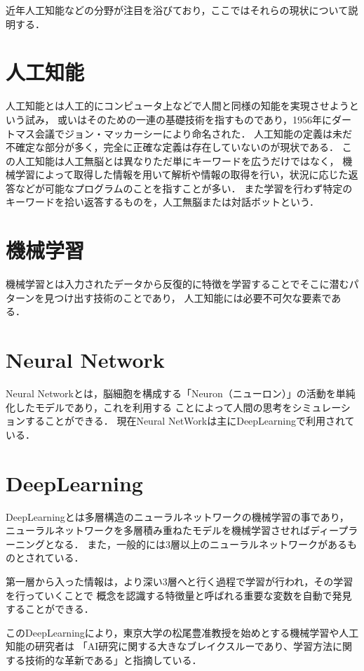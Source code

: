 近年人工知能などの分野が注目を浴びており，ここではそれらの現状について説明する．

\section{人工知能}
人工知能とは人工的にコンピュータ上などで人間と同様の知能を実現させようという試み，
或いはそのための一連の基礎技術を指すものであり，1956年にダートマス会議でジョン・マッカーシーにより命名された．
人工知能の定義は未だ不確定な部分が多く，完全に正確な定義は存在していないのが現状である．
この人工知能は人工無脳とは異なりただ単にキーワードを広うだけではなく，
機械学習によって取得した情報を用いて解析や情報の取得を行い，状況に応じた返答などが可能なプログラムのことを指すことが多い．
また学習を行わず特定のキーワードを拾い返答するものを，人工無脳または対話ボットという．

\section{機械学習}
機械学習とは入力されたデータから反復的に特徴を学習することでそこに潜むパターンを見つけ出す技術のことであり，
人工知能には必要不可欠な要素である．

\section{Neural Network}
Neural Networkとは，脳細胞を構成する「Neuron（ニューロン）」の活動を単純化したモデルであり，これを利用する
ことによって人間の思考をシミュレーションすることができる．
現在Neural NetWorkは主にDeepLearningで利用されている．

\section{DeepLearning}
DeepLearning\cite{deep}とは多層構造のニューラルネットワークの機械学習の事であり，
ニューラルネットワークを多層積み重ねたモデルを機械学習させればディープラーニングとなる．
また，一般的には3層以上のニューラルネットワークがあるものとされている．

第一層から入った情報は，より深い3層へと行く過程で学習が行われ，その学習を行っていくことで
概念を認識する特徴量と呼ばれる重要な変数を自動で発見することができる．

このDeepLearningにより，東京大学の松尾豊准教授\cite{boom}を始めとする機械学習や人工知能の研究者は
「AI研究に関する大きなブレイクスルーであり、学習方法に関する技術的な革新である」と指摘している．

